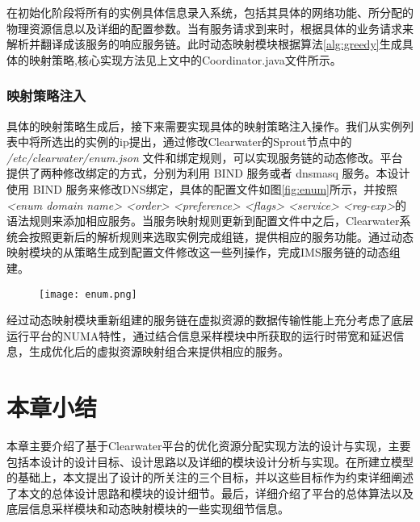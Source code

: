 在初始化阶段将所有的实例具体信息录入系统，包括其具体的网络功能、所分配的物理资源信息以及详细的配置参数。当有服务请求到来时，根据具体的业务请求来解析并翻译成该服务的响应服务链。此时动态映射模块根据算法\ref{alg:greedy}生成具体的映射策略,核心实现方法见上文中的Coordinator.java文件所示。

\subsubsection{映射策略注入}
具体的映射策略生成后，接下来需要实现具体的映射策略注入操作。我们从实例列表中将所选出的实例的ip提出，通过修改Clearwater的Sprout节点中的 \textit{/etc/clearwater/enum.json} 文件和绑定规则，可以实现服务链的动态修改。平台提供了两种修改绑定的方式，分别为利用 BIND 服务或者 dnsmasq 服务。本设计使用 BIND 服务来修改DNS绑定，具体的配置文件如图\ref{fig:enum}所示，并按照\textit{<enum domain name> <order> <preference> <flags> <service> <reg-exp>}的语法规则来添加相应服务。当服务映射规则更新到配置文件中之后，Clearwater系统会按照更新后的解析规则来选取实例完成组链，提供相应的服务功能。通过动态映射模块的从策略生成到配置文件修改这一些列操作，完成IMS服务链的动态组建。

\begin{figure}[!htp]
	\centering
	\texttt{[image: enum.png]}
\end{figure}

经过动态映射模块重新组建的服务链在虚拟资源的数据传输性能上充分考虑了底层运行平台的NUMA特性，通过结合信息采样模块中所获取的运行时带宽和延迟信息，生成优化后的虚拟资源映射组合来提供相应的服务。
\newpage
\section{本章小结}
本章主要介绍了基于Clearwater平台的优化资源分配实现方法的设计与实现，主要包括本设计的设计目标、设计思路以及详细的模块设计分析与实现。在所建立模型的基础上，本文提出了设计的所关注的三个目标，并以这些目标作为约束详细阐述了本文的总体设计思路和模块的设计细节。最后，详细介绍了平台的总体算法以及底层信息采样模块和动态映射模块的一些实现细节信息。